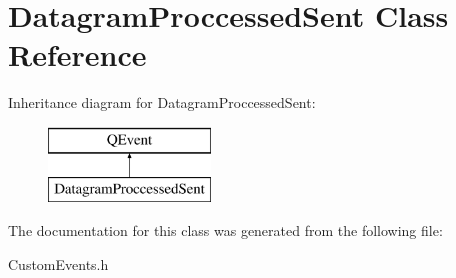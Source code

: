 \hypertarget{class_datagram_proccessed_sent}{}\section{Datagram\+Proccessed\+Sent Class Reference}
\label{class_datagram_proccessed_sent}
Inheritance diagram for Datagram\+Proccessed\+Sent\+:\begin{figure}[H]
\begin{center}
\leavevmode
\includegraphics[height=2.000000cm]{class_datagram_proccessed_sent}
\end{center}
\end{figure}


The documentation for this class was generated from the following file\+:\begin{DoxyCompactItemize}
\item 
Custom\+Events.\+h\end{DoxyCompactItemize}
